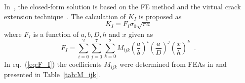 \documentclass[preprint,12pt]{elsarticle}
\begin{document}

In~\cite{shin2004experimental}, the closed-form solution is based on the FE method and the virtual crack extension technique~\cite{hellen1975method}.  The calculation of \(K_I\) is proposed as
%
\begin{equation}
\label{eq:K_I__F_I}
K_{I}=F_I \sigma_0 \sqrt{\pi a}
\end{equation}
%
where $F_I$ is a function of $a, b, D, h$ and $x$ given as
%
\begin{equation}
\label{eq:F_I}
F_{I}=\sum^{2}_{i=0} \sum^{7}_{j=0}\sum^{2}_{k=0} M_{ijk}\left(\frac{a}{b}\right)^i  \left(\frac{a}{D}\right)^j  \left(\frac{x}{h}\right)^k\;\;.
\end{equation}
In eq.~(\ref{eq:F_I}) the coefficients $M_{ijk}$ were determined from FEAs in \cite{shin2004experimental} and presented in Table~\ref{tab:M_ijk}.
\end{document}
